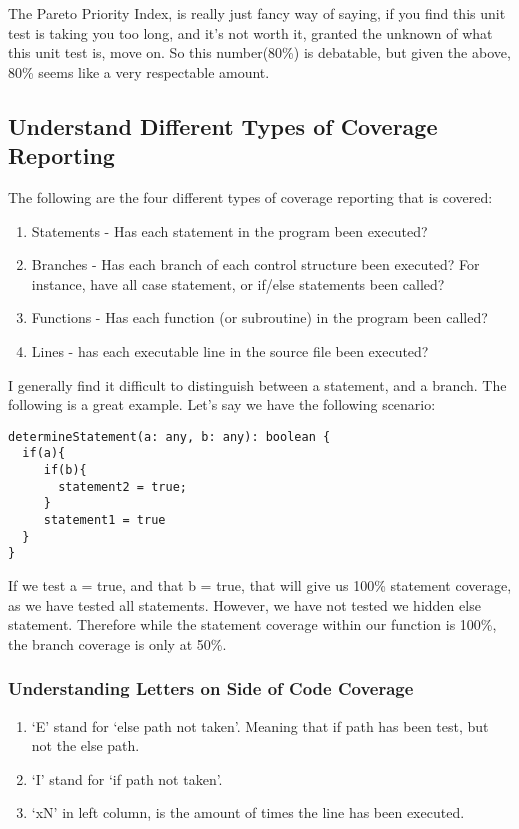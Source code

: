 The Pareto Priority Index, is really just fancy way of saying, if you find this
unit test is taking you too long, and it's not worth it, granted the unknown
of what this unit test is, move on. So this number(80\%) is debatable, but given
the above, 80\% seems like a very respectable amount.

\subsection{ Understand Different Types of Coverage Reporting }
The following are the four different types of coverage reporting that is
covered:
\begin{enumerate}
  \item Statements - Has each statement in the program been executed?
  \item Branches - Has each branch of each control structure been executed? For
  instance, have all case statement, or if/else statements been called?
  \item Functions - Has each function (or subroutine) in the program been called?
  \item Lines - has each executable line in the source file been executed?
\end{enumerate}

I generally find it difficult to distinguish between a statement, and a
branch. The following is a great example. Let's say we have the following
scenario:
\begin{lstlisting}
determineStatement(a: any, b: any): boolean {
  if(a){
     if(b){
       statement2 = true;
     }
     statement1 = true
  }
}
\end{lstlisting}

If we test a = true, and that b = true, that will give us 100\% statement
coverage, as we have tested all statements. However, we have not tested we
hidden else statement. Therefore while the statement coverage within our
function is 100\%, the branch coverage is only at 50\%.

\subsubsection{Understanding Letters on Side of Code Coverage}
\begin{enumerate}
  \item `E' stand for `else path not taken'. Meaning that if path has been test,
  but not the else path.
  \item `I' stand for `if path not taken'.
  \item `xN' in left column, is the amount of times the line has been executed.
\end{enumerate}


